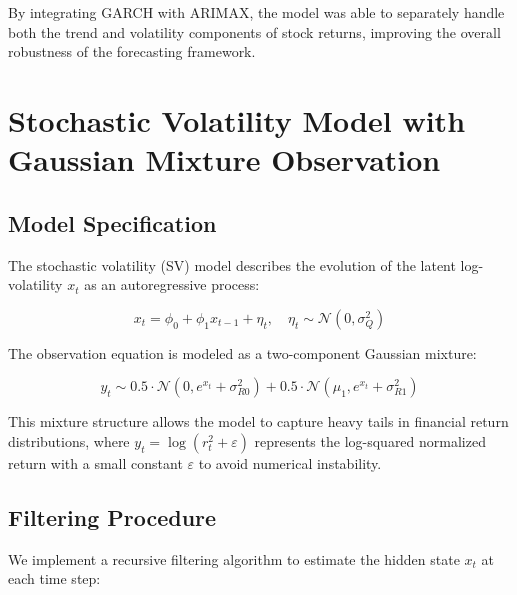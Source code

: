 By integrating GARCH with ARIMAX, the model was able to separately handle both the trend and volatility components of stock returns, improving the overall robustness of the forecasting framework.

\section{Stochastic Volatility Model with Gaussian Mixture Observation}
\label{sec:sv-model}

\subsection{Model Specification}

The stochastic volatility (SV) model describes the evolution of the latent log-volatility $x_t$ as an autoregressive process:

\begin{equation}
x_t = \phi_0 + \phi_1 x_{t-1} + \eta_t, \quad \eta_t \sim \mathcal{N}(0, \sigma_Q^2)
\end{equation}

The observation equation is modeled as a two-component Gaussian mixture:

\begin{equation}
y_t \sim 0.5 \cdot \mathcal{N}(0, e^{x_t} + \sigma_{R0}^2) + 0.5 \cdot \mathcal{N}(\mu_1, e^{x_t} + \sigma_{R1}^2)
\end{equation}

This mixture structure allows the model to capture heavy tails in financial return distributions, where $y_t = \log(r_t^2 + \varepsilon)$ represents the log-squared normalized return with a small constant $\varepsilon$ to avoid numerical instability.

\subsection{Filtering Procedure}

We implement a recursive filtering algorithm to estimate the hidden state $x_t$ at each time step:

